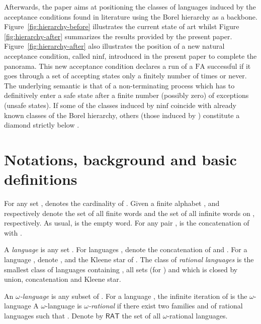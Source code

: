 \documentclass[preprint]{elsarticle}
\newcommand{\Nlanguage}{\ensuremath{\omega}-language\xspace}
\newcommand{\Nrational}{\ensuremath{\omega}-rational\xspace}
\newcommand{\FA}{\ensuremath{\mathrm{FA}}\xspace}
\newcommand{\ninf}{\ensuremath{\mathrm{ninf}}}
\newcommand{\RAT}{\ensuremath{\mathsf{RAT}}\xspace}
\begin{document}
Afterwards, the paper aims at positioning the classes of languages induced by the acceptance conditions found
in literature using the Borel hierarchy as a backbone. Figure~\ref{fig:hierarchy-before} illustrates the 
current state of art whilst Figure \ref{fig:hierarchy-after} summarizes the results provided by the 
present paper. Figure~\ref{fig:hierarchy-after} also illustrates the position of a new natural acceptance condition,
called \emph{\ninf}, 
introduced in the present paper to complete the panorama. This new acceptance condition declares a run of a \FA
successful if it goes through a set of accepting states only a finitely number of times or never. The underlying semantic
is that of a non-terminating process which has to definitively enter a safe state after a finite number (possibly zero) of 
exceptions (unsafe states). If some of the classes induced by \emph{\ninf} coincide with already known classes of the
Borel hierarchy, others (those induced by ) constitute a diamond strictly below .  

\section{Notations, background and basic definitions}
For any set ,  denotes the cardinality of . 
Given a finite alphabet ,  and  respectively denote the set of all finite words and the set of all infinite 
words on , respectively. As usual,   is the empty word. For any pair , 
 is the concatenation of  with .

A \emph{language} is any set . For languages ,  denote  the concatenation of  and . For a language , denote ,  and  the Kleene star of . 
The class of \emph{rational languages} 
is the smallest class of languages containing , all sets  (for ) and which is closed by union, concatenation and Kleene star.

An \emph{\Nlanguage} is any subset of . For a language , the infinite iteration of  is the \Nlanguage
 A \Nlanguage  is \emph{\Nrational} if there exist two families  and  of rational languages such that . Denote by \RAT the set of all \Nrational languages.
\end{document}
